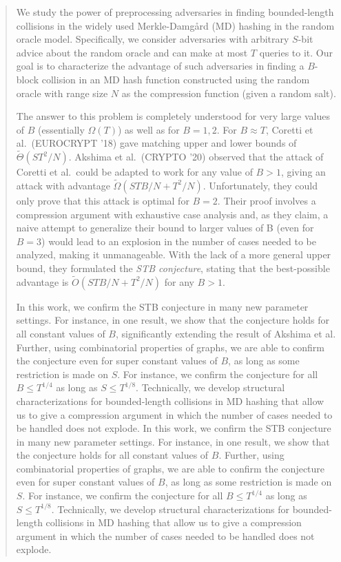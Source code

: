 
\begin{abstract}
  We study the power of preprocessing adversaries in finding bounded-length collisions in the widely used Merkle-Damg{\aa}rd (MD) hashing in the random oracle model. Specifically, we consider adversaries with arbitrary $S$-bit advice about the random oracle and can make at most $T$ queries to it. Our goal is to characterize the advantage of such adversaries in finding a $B$-block collision in an MD hash function constructed using the random oracle with range size $N$ as the compression function (given a random salt).
  
  The answer to this problem is completely understood for very large values of $B$ (essentially $\Omega(T)$) as well as for $B=1,2$. For $B\approx T$, Coretti et al.~(EUROCRYPT '18) gave matching upper and lower bounds of $\tilde\Theta(ST^2/N)$. Akshima et al.~(CRYPTO '20) observed that the attack of Coretti et al.\ could be adapted to work for any value of $B>1$, giving an attack with advantage $\tilde\Omega(STB/N + T^2/N)$. Unfortunately, they could only prove that this attack is optimal for $B=2$. Their proof involves a compression argument with exhaustive case analysis and, as they claim, a naive attempt to generalize their bound to larger values of B (even for $B=3$) would lead to an explosion in the number of cases needed to be analyzed, making it unmanageable.  With the lack of a more general upper bound, they formulated the \emph{STB conjecture}, stating that the best-possible advantage is $\tilde O(STB/N + T^2/N)$ for any $B>1$. 

  \ifnum{}
  In this work, we confirm the STB conjecture in many new parameter settings. For instance, in one result, we show that the conjecture holds for all constant values of $B$, significantly extending the result of Akshima et al. Further, using combinatorial properties of graphs, we are able to confirm the conjecture even for super constant values of $B$, as long as some restriction is made on $S$. For instance, we confirm the conjecture for all $B \le T^{1/4}$ as long as $S \le T^{1/8}$. Technically,  
  we develop structural characterizations for bounded-length collisions in MD hashing that allow us to give a compression argument in which the number of cases needed to be handled does not explode. 
  \else
  In this work, we confirm the STB conjecture in many new parameter settings. For instance, in one result, we show that the conjecture holds for all constant values of $B$. Further, using combinatorial properties of graphs, we are able to confirm the conjecture even for super constant values of $B$, as long as some restriction is made on $S$. For instance, we confirm the conjecture for all $B \le T^{1/4}$ as long as $S \le T^{1/8}$. Technically,  
  we develop structural characterizations for bounded-length collisions in MD hashing that allow us to give a compression argument in which the number of cases needed to be handled does not explode. 
  \fi
  
 

\end{abstract}
